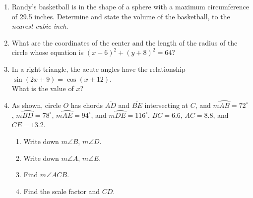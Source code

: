 \documentclass[12pt, oneside]{article}
\begin{document}
\begin{enumerate}[itemsep=1.2cm]
\newpage
\item Randy's basketball is in the shape of a sphere with a maximum circumference of 29.5 inches. Determine and state the volume of the basketball, to the \emph{nearest cubic inch}.
\vspace{2cm}

\item What are the coordinates of the center and the length of the radius of the circle whose equation is $(x-6)^2+(y+8)^2=64$?
\vspace{1cm}

\item In a right triangle, the acute angles have the relationship \\$\sin (2x + 9)=\cos (x+12)$.\\[0.25cm]
What is the value of $x$?
\vspace{1cm}

\item As shown, circle $O$ has chords $\overline{AD}$ and $\overline{BE}$ intersecting at $C$, and $m \wideparen{AB}=72^\circ$, $m \wideparen{BD}=78^\circ$, $m \wideparen{AE}=94^\circ$, and $m \wideparen{DE}=116^\circ$. $BC=6.6$, $AC=8.8$, and $CE=13.2$.
  \begin{multicols}{2}
  \raggedcolumns
  \begin{flushright}
  \end{flushright}
  \begin{enumerate}
    \item Write down $m\angle B$, $m\angle D$. \vspace{0.5cm}
    \item Write down $m\angle A$, $m\angle E$. \vspace{0.5cm}
    \item Find $m\angle ACB$. \vspace{1.5cm}
    \item Find the scale factor and $CD$.
    \end{enumerate}
  \end{multicols}

\end{enumerate}
\end{document}
